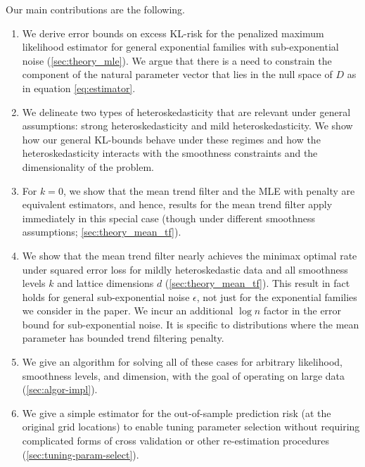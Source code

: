 \documentclass[ejs,noshowframe]{imsart}
\theoremstyle{plain}
\theoremstyle{definition}
\begin{document}
Our main contributions are the following.
\begin{enumerate}
\item We derive error bounds on excess KL-risk for the penalized maximum
  likelihood 
  estimator for general exponential families with sub-exponential noise
  (\autoref{sec:theory_mle}). 
  We argue that there is a need to constrain the component of the
  natural parameter vector that lies in the null space of $D$ as in equation
  \eqref{eq:estimator}. 
  
\item We delineate two types of heteroskedasticity that are relevant under
  general assumptions: strong heteroskedasticity and mild heteroskedasticity. We
  show how our general KL-bounds behave under these regimes and how the
  heteroskedasticity interacts with the smoothness constraints and the
  dimensionality of the problem.

\item For $k=0$, we show that the mean trend filter and the MLE with penalty are
  equivalent estimators, and hence, results for the mean trend filter apply immediately in
  this special case (though under different smoothness assumptions;
  \autoref{sec:theory_mean_tf}).   

\item We show that the mean trend filter nearly achieves the minimax optimal rate
  under squared error loss for mildly heteroskedastic data and 
  all smoothness levels $k$ and lattice dimensions $d$
  (\autoref{sec:theory_mean_tf}). This result in fact holds 
  for general sub-exponential noise $\epsilon$, not just for the exponential
  families we consider in the paper. We incur an additional $\log n$ factor in
  the error bound for sub-exponential noise.  It is specific to distributions
  where the mean parameter has bounded trend filtering penalty.
  
\item We give an algorithm for solving all of these cases for arbitrary likelihood,
  smoothness levels, and dimension, with the goal of operating on large data
  (\autoref{sec:algor-impl}). 

\item We give a simple estimator for the out-of-sample prediction risk (at the
    original grid locations) to enable tuning parameter selection without
    requiring complicated forms of cross validation or other re-estimation
    procedures (\autoref{sec:tuning-param-select}). 
\end{enumerate}
\end{document}
